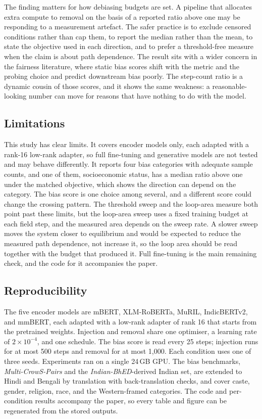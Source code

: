 \documentclass[Afour,sageh,times]{sagej}
\begin{document}
The finding matters for how debiasing budgets are set. A pipeline that allocates extra compute to removal on the basis of a reported ratio above one may be responding to a measurement artefact. The safer practice is to exclude censored conditions rather than cap them, to report the median rather than the mean, to state the objective used in each direction, and to prefer a threshold-free measure when the claim is about path dependence. The result sits with a wider concern in the fairness literature, where static bias scores shift with the metric and the probing choice and predict downstream bias poorly. The step-count ratio is a dynamic cousin of those scores, and it shows the same weakness: a reasonable-looking number can move for reasons that have nothing to do with the model.

\subsection{Limitations}

This study has clear limits. It covers encoder models only, each adapted with a rank-16 low-rank adapter, so full fine-tuning and generative models are not tested and may behave differently. It reports four bias categories with adequate sample counts, and one of them, socioeconomic status, has a median ratio above one under the matched objective, which shows the direction can depend on the category. The bias score is one choice among several, and a different score could change the crossing pattern. The threshold sweep and the loop-area measure both point past these limits, but the loop-area sweep uses a fixed training budget at each field step, and the measured area depends on the sweep rate. A slower sweep moves the system closer to equilibrium and would be expected to reduce the measured path dependence, not increase it, so the loop area should be read together with the budget that produced it. Full fine-tuning is the main remaining check, and the code for it accompanies the paper.

\subsection{Reproducibility}

The five encoder models are mBERT, XLM-RoBERTa, MuRIL, IndicBERTv2, and mmBERT, each adapted with a low-rank adapter of rank 16 that starts from the pretrained weights. Injection and removal share one optimiser, a learning rate of $2\times10^{-4}$, and one schedule. The bias score is read every 25 steps; injection runs for at most 500 steps and removal for at most 1{,}000. Each condition uses one of three seeds. Experiments ran on a single 24\,GB GPU. The bias benchmarks, \textit{Multi-CrowS-Pairs} and the \textit{Indian-BhED}-derived Indian set, are extended to Hindi and Bengali by translation with back-translation checks, and cover caste, gender, religion, race, and the Western-framed categories. The code and per-condition results accompany the paper, so every table and figure can be regenerated from the stored outputs.
\end{document}
